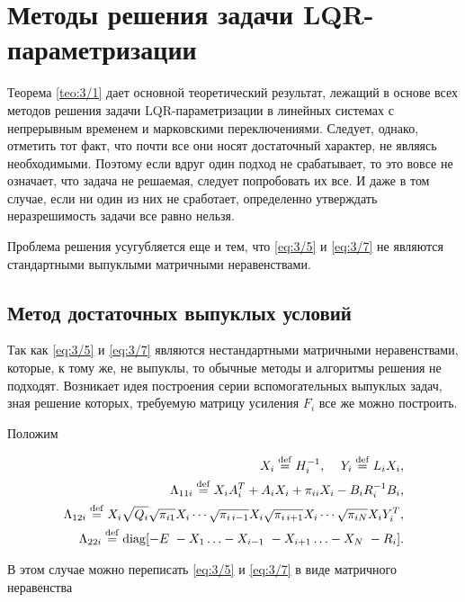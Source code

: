 \chapter{Методы решения задачи LQR-параметризации}

Теорема \vref{teo:3/1} дает основной теоретический результат, лежащий в основе всех методов решения задачи LQR-параметризации в линейных системах с непрерывным временем и марковскими переключениями. Следует, однако, отметить тот факт, что почти все они носят достаточный характер, не являясь необходимыми. Поэтому если вдруг один подход не срабатывает, то это вовсе не означает, что задача не решаемая, следует попробовать их все. И даже в том случае, если ни один из них не сработает, определенно утверждать неразрешимость задачи все равно нельзя.

Проблема решения усугубляется еще и тем, что \ref{eq:3/5} и \vref{eq:3/7} не являются стандартными выпуклыми матричными неравенствами.






\section{Метод достаточных выпуклых условий}

Так как \ref{eq:3/5} и \vref{eq:3/7} являются нестандартными матричными неравенствами, которые, к тому же, не выпуклы, то обычные методы и алгоритмы решения не подходят. Возникает идея построения серии вспомогательных выпуклых задач, зная решение которых, требуемую матрицу усиления $F_i$ все же можно построить.

Положим

\begin{eqnarray*}
X_i \stackrel{\mathrm{def}}{=} H_i^{-1}{,~~~~} Y_i \stackrel{\mathrm{def}}{=} L_iX_i\mbox{,} \\
\Lambda_{11i} \stackrel{\mathrm{def}}{=} X_iA_i^T + A_iX_i + \pi_{ii}X_i - B_iR_i^{-1}B_i\mbox{,} \\
\Lambda_{12i} \stackrel{\mathrm{def}}{=} X_i\sqrt{Q_i}\sqrt{\pi_{i1}}X_i \cdots \sqrt{\pi_{i\,i-1}}X_i\sqrt{\pi_{i\,i+1}}X_i \cdots \sqrt{\pi_{iN}}X_iY_i^T\mbox{,} \\
\Lambda_{22i} \stackrel{\mathrm{def}}{=} \operatorname{\mathrm{diag}}[-E~-X_1 \ldots -X_{i-1}~-X_{i+1} \ldots -X_N~-R_i]\mbox{.}
\end{eqnarray*}

В этом случае можно переписать \ref{eq:3/5} и \vref{eq:3/7} в виде матричного неравенства

